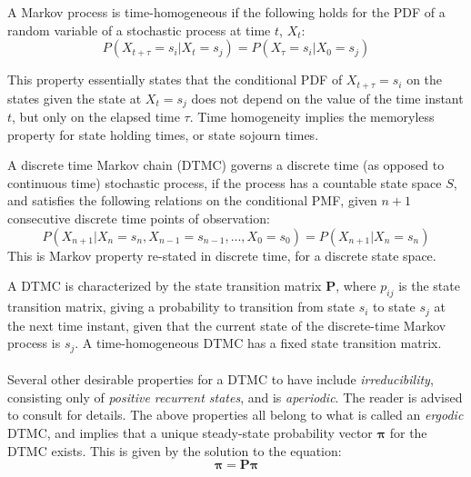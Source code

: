 \begin{definition}
    A Markov process is time-homogeneous if the following holds for the PDF of a random variable of a stochastic process at time \(t\), \(X_{t}\):
    \begin{equation}\label{eq:TimeHomogeneity}
        P(X_{t + \tau}=s_{i} | X_{t}=s_{j}) = P(X_{\tau}=s_{i} | X_{0}=s_{j})
    \end{equation}
\end{definition}

This property essentially states that the conditional PDF of \(X_{t+\tau}=s_{i}\) on the states given the state at \(X_{t}=s_{j}\) does not depend on the value of the time instant \(t\), but only on the elapsed time \(\tau\). Time homogeneity implies the memoryless property for state holding times, or state sojourn times.

\begin{definition}
    A discrete time Markov chain (DTMC) governs a discrete time (as opposed to continuous time) stochastic process, if the process has a countable state space \(S\), and satisfies the following relations on the conditional PMF, given \(n+1\) consecutive discrete time points of observation:
    \[P(X_{n+1} | X_n=s_n , X_{n-1}=s_{n-1} , ... , X_0=s_0 ) = P(X_{n+1} | X_n=s_n)\]
    This is Markov property re-stated in discrete time, for a discrete state space. 
\end{definition}

A DTMC is characterized by the state transition matrix \(\mathbf{P}\), where \(p_{ij}\) is the state transition matrix, giving a probability to transition from state \(s_i\) to state \(s_j\) at the next time instant, given that the current state of the discrete-time Markov process is \(s_j\). A time-homogeneous DTMC has a fixed state transition matrix.
\\\\
Several other desirable properties for a DTMC to have include \textit{irreducibility}, consisting only of \textit{positive recurrent states}, and is \textit{aperiodic}. The reader is advised to consult \cite{Bolch2006QueueingApplications} for details. The above properties all belong to what is called an \textit{ergodic} DTMC, and implies that a unique steady-state probability vector \(\mathbf{\pi}\) for the DTMC exists. This is given by the solution to the equation:
\begin{equation}
    \boldsymbol{\pi} = \mathbf{P}\boldsymbol{\pi}
\end{equation}

